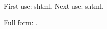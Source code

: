 \documentclass{article}
\begin{document}
    First use: \gls{shtml}. Next use: \gls{shtml}.

    \newpage
    Full form: .

    \printunsrtglossaries
    
\end{document}
